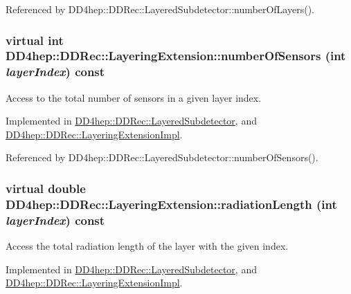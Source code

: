 Referenced by DD4hep::DDRec::LayeredSubdetector::numberOfLayers().\hypertarget{class_d_d4hep_1_1_d_d_rec_1_1_layering_extension_a91d00c26112a0456117d1036db335e5d}{
\subsubsection[{numberOfSensors}]{\setlength{\rightskip}{0pt plus 5cm}virtual int DD4hep::DDRec::LayeringExtension::numberOfSensors (int {\em layerIndex}) const}}
\label{class_d_d4hep_1_1_d_d_rec_1_1_layering_extension_a91d00c26112a0456117d1036db335e5d}


Access to the total number of sensors in a given layer index. 

Implemented in \hyperlink{class_d_d4hep_1_1_d_d_rec_1_1_layered_subdetector_a3182cb0593f3a49c5cc10b0befffbe31}{DD4hep::DDRec::LayeredSubdetector}, and \hyperlink{class_d_d4hep_1_1_d_d_rec_1_1_layering_extension_impl_a1cc4193b9f53354254635eed6e3f11ce}{DD4hep::DDRec::LayeringExtensionImpl}.

Referenced by DD4hep::DDRec::LayeredSubdetector::numberOfSensors().\hypertarget{class_d_d4hep_1_1_d_d_rec_1_1_layering_extension_adf915de4949eb6f0406045b4b38dd469}{
\subsubsection[{radiationLength}]{\setlength{\rightskip}{0pt plus 5cm}virtual double DD4hep::DDRec::LayeringExtension::radiationLength (int {\em layerIndex}) const}}
\label{class_d_d4hep_1_1_d_d_rec_1_1_layering_extension_adf915de4949eb6f0406045b4b38dd469}


Access the total radiation length of the layer with the given index. 

Implemented in \hyperlink{class_d_d4hep_1_1_d_d_rec_1_1_layered_subdetector_a0c551dbd2e52032cf7a70e9b2dd457b4}{DD4hep::DDRec::LayeredSubdetector}, and \hyperlink{class_d_d4hep_1_1_d_d_rec_1_1_layering_extension_impl_a49155c5d57fdeed6553f7f9f7d492b6c}{DD4hep::DDRec::LayeringExtensionImpl}.

